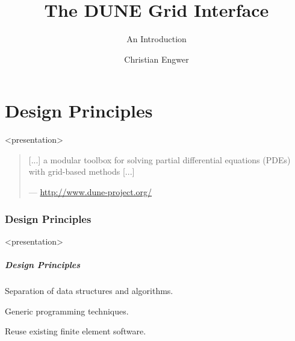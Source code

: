\documentclass[aspectratio=169,11pt]{beamer}
\title{The DUNE Grid Interface}
\subtitle{An Introduction}
\author{Christian Engwer}
\institute[]
{
  Applied Mathematics\\WWU Münster\\
}
\theoremstyle{definition}
\begin{document}


\part{Design Principles}

\begin{onlyenv}<presentation>
\begin{frame}
   \partpage
   \pause
  \begin{quote}
    {\normalfont{}[...]} a modular toolbox for solving partial
    differential equations (PDEs) with grid-based
    methods {\normalfont{}[...]}

    \hfill--- {\normalfont \url{http://www.dune-project.org/}}
  \end{quote}
 \end{frame}
\end{onlyenv}

\section{Design Principles}

\begin{onlyenv}<presentation>
  \begin{frame} \frametitle{Design Principles}

    \begin{description}
    \item[Flexibility:]
      {Separation of data structures and algorithms.}\\[2ex]
    \item[Efficiency:]
      {Generic programming techniques.}\\[2ex]
    \item[Legacy Code:]
      {Reuse existing finite element software.}\\[2ex]
    \end{description}

  \end{frame}
\end{onlyenv}
\end{document}
